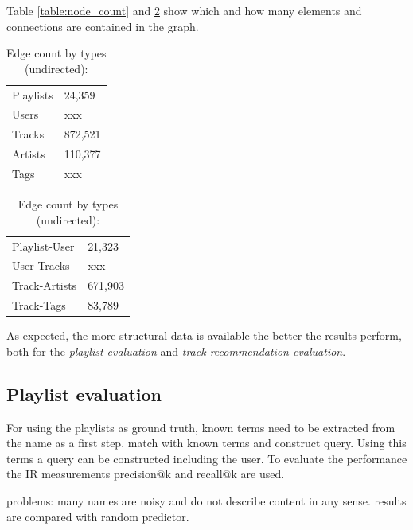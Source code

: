 \documentclass[a4paper]{llncs}
\begin{document}
	Table \ref{table:node_count} and \ref{table:edge_count} show which and how many elements and connections are contained in the graph.
	
	\begin{table}[H]
		\begin{minipage}{.5\textwidth}
			
			\centering
			\caption{Node count by type:}
			\label{table:node_count}
			\begin{tabular}{l|l}
				Playlists & 24,359  \\
				Users     & xxx     \\
				Tracks    & 872,521 \\
				Artists   & 110,377  \\
				Tags      & xxx
			\end{tabular}
			
		\end{minipage}
		\begin{minipage}{.5\textwidth}
			
			\centering
			\caption{Edge count by types (undirected):}
			\label{table:edge_count}
			\begin{tabular}{l|l}
				Playlist-User & 21,323  \\
				User-Tracks     & xxx     \\
				Track-Artists    & 671,903 \\
				Track-Tags   & 83,789
			\end{tabular}
			
		\end{minipage}
	\end{table}
	
	
	
	As expected, the more structural data is available the better the results perform, both for the \emph{playlist evaluation} and \emph{track recommendation evaluation}.
	
	\subsection{Playlist evaluation}
	\label{subsec:playlist_eval}
	For using the playlists as ground truth, known terms need to be extracted from the name as a first step. match with known terms and construct query. Using this terms a query can be constructed including the user. To evaluate the performance the IR measurements precision@k and recall@k are used.
	
	
	problems: many names are noisy and do not describe content in any sense. results are compared with random predictor.
	
\end{document}

